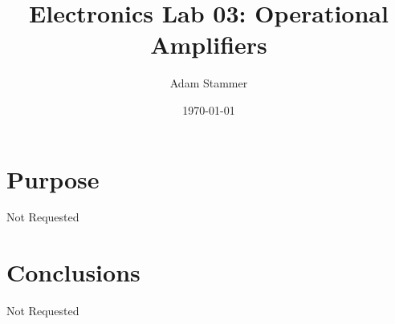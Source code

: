\documentclass[prb,preprint]{revtex4-1}
\begin{document}
\title{Electronics Lab 03: Operational Amplifiers}
\author{Adam Stammer}

\date{\today}


\maketitle


%
%
%
%
%
%
%
%

\section{Purpose}
Not Requested  

\section{Conclusions}
Not Requested
\end{document}

